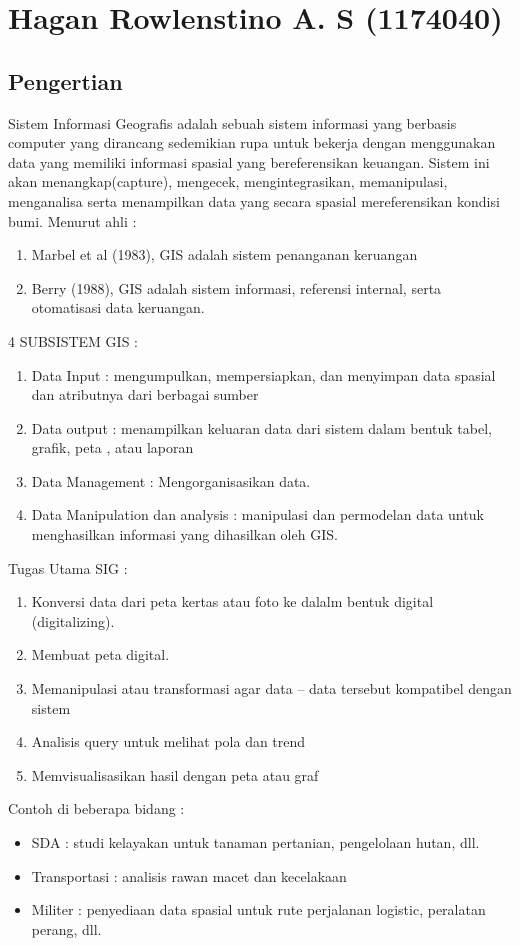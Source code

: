 \section{Hagan Rowlenstino A. S (1174040)}
\subsection{Pengertian}
Sistem Informasi Geografis adalah sebuah sistem informasi yang berbasis computer yang dirancang sedemikian rupa untuk bekerja dengan menggunakan data yang memiliki informasi spasial yang bereferensikan keuangan. Sistem ini akan menangkap(capture), mengecek, mengintegrasikan, memanipulasi, menganalisa serta menampilkan data yang secara spasial mereferensikan kondisi bumi.
Menurut ahli :
\begin{enumerate}
	\item Marbel et al (1983), GIS adalah sistem penanganan keruangan
	\item Berry (1988), GIS adalah sistem informasi, referensi internal, serta otomatisasi data keruangan.
\end{enumerate}

4 SUBSISTEM GIS :
\begin{enumerate}
	\item Data Input : mengumpulkan, mempersiapkan, dan menyimpan data spasial dan atributnya dari berbagai sumber
	\item Data output : menampilkan keluaran data dari sistem dalam bentuk tabel, grafik, peta , atau laporan
	\item Data Management : Mengorganisasikan data.
	\item Data Manipulation dan analysis : manipulasi dan permodelan data untuk menghasilkan informasi yang dihasilkan oleh GIS.
\end{enumerate}
Tugas Utama SIG :
\begin{enumerate}
	\item Konversi data dari peta kertas atau foto ke dalalm bentuk digital (digitalizing).
	\item Membuat peta digital.
	\item Memanipulasi atau transformasi agar data – data tersebut kompatibel dengan sistem
	\item Analisis query untuk melihat pola dan trend
	\item Memvisualisasikan hasil dengan peta atau graf
\end{enumerate}
Contoh di beberapa bidang :
\begin{itemize}
	\item SDA : studi kelayakan untuk tanaman pertanian, pengelolaan hutan, dll.
	\item Transportasi : analisis rawan macet dan kecelakaan
	\item Militer : penyediaan data spasial untuk rute perjalanan logistic, peralatan perang, dll.
\end{itemize}

